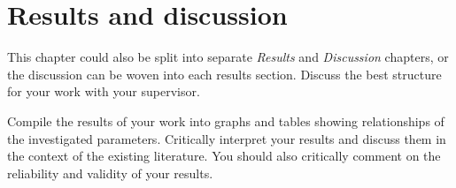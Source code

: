 \chapter{Results and discussion}

{
    \color{orange}
    This chapter could also be split into separate \emph{Results} and \emph{Discussion} chapters, or the discussion can be woven into each results section. Discuss the best structure for your work with your supervisor.

    Compile the results of your work into graphs and tables showing relationships of the investigated parameters.
    Critically interpret your results and discuss them in the context of the existing literature. 
    You should also critically comment on the reliability and validity of your results.

}